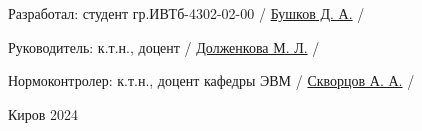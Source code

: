 \begin{titlepage}
	\newcommand{\ulinesize}{2.5cm}

	\large
	\vspace{1cm}
	\noindent
	Разработал: студент гр.ИВТб-4302-02-00 \hfill \uline{\hspace{\ulinesize}}
	/ \uline{Бушков Д. А.} / \hspace{8mm} \uline{\hspace{\ulinesize}}

	\vspace{1.5cm}
	\noindent
	Руководитель: к.т.н., доцент
	\hfill \uline{\hspace{\ulinesize}}
	/ \uline{Долженкова М. Л.} / \uline{\hspace{\ulinesize}}

	\vspace{1.5cm}
	\noindent
	Нормоконтролер: к.т.н., доцент кафедры ЭВМ
	\hfill \uline{\hspace{\ulinesize}}
	/ \uline{Скворцов А. А.} / \hspace{4mm} \uline{\hspace{\ulinesize}}

	\begin{center}
		\vfill
		Киров 2024
		\vspace{1cm}
	\end{center}


\end{titlepage}
